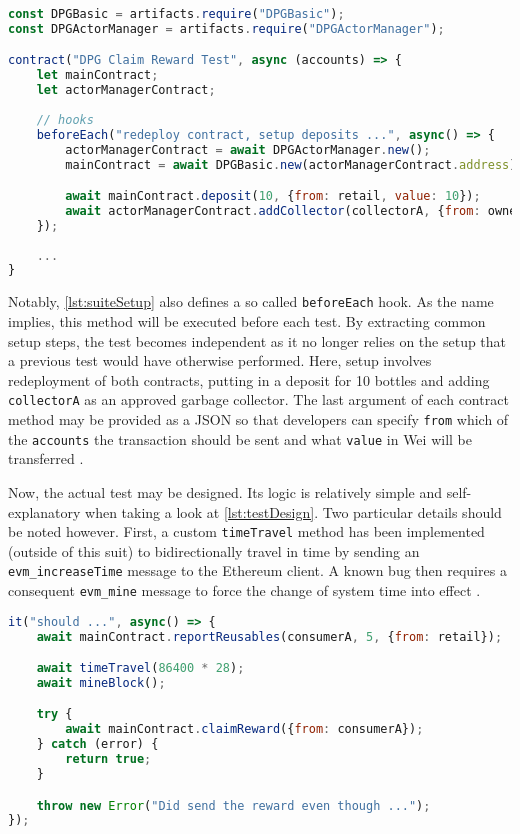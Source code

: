 \begin{lstlisting}[language=JavaScript, caption=Setup of test suite, label=lst:suiteSetup]
const DPGBasic = artifacts.require("DPGBasic");
const DPGActorManager = artifacts.require("DPGActorManager");

contract("DPG Claim Reward Test", async (accounts) => {
	let mainContract;
	let actorManagerContract;
	
	// hooks
	beforeEach("redeploy contract, setup deposits ...", async() => {
		actorManagerContract = await DPGActorManager.new();
		mainContract = await DPGBasic.new(actorManagerContract.address);

		await mainContract.deposit(10, {from: retail, value: 10});
		await actorManagerContract.addCollector(collectorA, {from: owner});
	});
	
	...
}
\end{lstlisting}

Notably, \autoref{lst:suiteSetup} also defines a so called \texttt{beforeEach} hook. As the name implies, this method will be executed before each test. By extracting common setup steps, the test becomes independent as it no longer relies on the setup that a previous test would have otherwise performed. Here, setup involves redeployment of both contracts, putting in a deposit for 10 bottles and adding \texttt{collectorA} as an approved garbage collector. The last argument of each contract method may be provided as a JSON so that developers can specify \texttt{from} which of the \texttt{accounts} the transaction should be sent and what \texttt{value} in Wei will be transferred \cite[Interacting With Your Contracts]{truffleSuite}.

Now, the actual test may be designed. Its logic is relatively simple and self-explanatory when taking a look at \autoref{lst:testDesign}. Two particular details should be noted however. First, a custom \texttt{timeTravel} method has been implemented (outside of this suit) to bidirectionally travel in time by sending an \texttt{evm\_increaseTime} message to the Ethereum client. A known bug then requires a consequent \texttt{evm\_mine} message to force the change of system time into effect \cite{truffleAwait}.

\pagebreak

\begin{lstlisting}[language=JavaScript, caption=Example test case, label=lst:testDesign]
it("should ...", async() => {
    await mainContract.reportReusables(consumerA, 5, {from: retail});

    await timeTravel(86400 * 28);
    await mineBlock();

    try {
        await mainContract.claimReward({from: consumerA});
    } catch (error) {
        return true;
    }

    throw new Error("Did send the reward even though ...");
});
\end{lstlisting}

